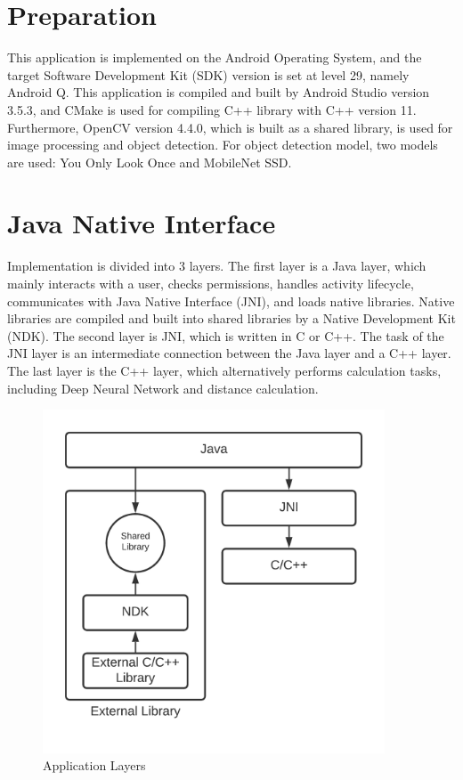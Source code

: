     \section{Preparation}
        This application is implemented on the Android Operating System,
        and the target Software Development Kit (SDK) version is set at level 29, namely Android Q.
        This application is compiled and built by Android Studio version 3.5.3,
        and CMake is used for compiling C++ library with C++ version 11.
        Furthermore, OpenCV version 4.4.0, which is built as a shared library, is used for image processing and object detection.
        For object detection model, two models are used: You Only Look Once and MobileNet SSD.

    \section{Java Native Interface}
        Implementation is divided into 3 layers.
            The first layer is a Java layer, which mainly interacts with a user,
            checks permissions, handles activity lifecycle, communicates with Java Native Interface (JNI), and loads native libraries.
                Native libraries are compiled and built into shared libraries by a Native Development Kit (NDK).
            The second layer is JNI, which is written in C or C++.
                The task of the JNI layer is an intermediate connection between the Java layer and a C++ layer.
            The last layer is the C++ layer, which alternatively performs calculation tasks,
            including Deep Neural Network and distance calculation.

        \begin{figure}[!ht]
            \centering
            \includegraphics[width=4in]{images/chapter3/application-layers.png}
            \caption{Application Layers}
            \label{systemOverview}
        \end{figure}

